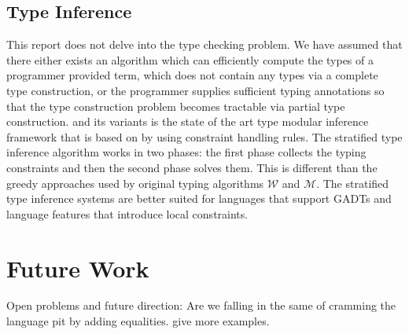 \documentclass[screen,nonacm]{acmart}
\begin{document}
\subsection{Type Inference}\label{sec:rw-type-inf}
This report does not delve into the type checking problem. We have assumed that there either exists an algorithm which can efficiently compute the types of a programmer provided term, which does not contain any types via a complete type construction\cite{milner_theory_1978}, or the programmer supplies sufficient typing annotations so that the type construction problem becomes tractable via partial type construction\cite{pierce_local_2000, dunfield_bidirectional_2021}. \HMX and its variants is the state of the art type modular inference framework that is based on by using constraint handling rules. The stratified type inference algorithm\cite{pottier_stratified_2006} works in two phases: the first phase collects the typing constraints and then the second phase solves them. This is different than the greedy approaches used by original typing algorithms\cite{lee_proofs_1998} $\mathcal{W}$ and $\mathcal{M}$. The stratified type inference systems are better suited for languages that support GADTs and language features that introduce local constraints\cite{vytiniotis_outsideinx_2011}.

\section{Future Work}\label{sec:future-work}
Open problems and future direction: Are we falling in the same of
cramming the language pit by adding equalities. give more examples.
\end{document}
